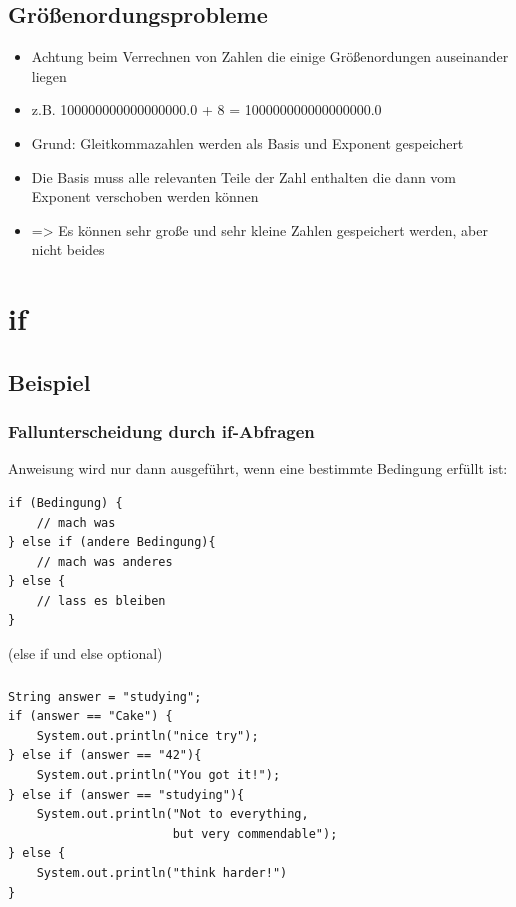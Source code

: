\documentclass[final]{beamer}
\begin{document}
\subsection{Größenordungsprobleme}
\begin{frame}
	\begin{itemize}
		\item{Achtung beim Verrechnen von Zahlen die einige Größenordungen auseinander liegen}
		\item{z.B. 100000000000000000.0 + 8 = 100000000000000000.0}
		\item{Grund: Gleitkommazahlen werden als Basis und Exponent gespeichert}
		\item{Die Basis muss alle relevanten Teile der Zahl enthalten die dann vom Exponent verschoben werden können}
		\item{=> Es können sehr große und sehr kleine Zahlen gespeichert werden, aber nicht beides}
	\end{itemize}
\end{frame}

\section{if}
\subsection{Beispiel}
\begin{frame}[containsverbatim]
	\frametitle{Fallunterscheidung durch if-Abfragen}
	Anweisung wird nur dann ausgeführt, wenn eine bestimmte Bedingung erfüllt ist:
	\begin{lstlisting}
if (Bedingung) {
	// mach was
} else if (andere Bedingung){
	// mach was anderes
} else {
	// lass es bleiben
}
	\end{lstlisting}
	(else if und else optional)
\end{frame}

\begin{frame}[containsverbatim]
	\frametitle{}
	\begin{lstlisting}
String answer = "studying";
if (answer == "Cake") {
	System.out.println("nice try");
} else if (answer == "42"){
	System.out.println("You got it!");
} else if (answer == "studying"){
	System.out.println("Not to everything,
                       but very commendable");
} else {
	System.out.println("think harder!")
}
	\end{lstlisting}
\end{frame}
\end{document}
